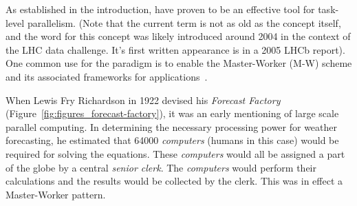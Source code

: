 \documentclass{sig-alternate}
\begin{document}

As established in the introduction, \pilotjobs have proven to be an
effective tool for task-level parallelism. (Note that the current term
\textit{\pilotjob} is not as old as the concept itself, and the word
\pilot for this concept was likely introduced around 2004 in the context
of the LHC data challenge. It's first written appearance is in a 2005
LHCb report\cite{lhcb2005}). 
One common use for the \pilotjob paradigm is to enable the Master-Worker
(M-W) scheme and its associated frameworks for
applications~\cite{Shao:2000:masterslave}.


When Lewis Fry Richardson in 1922 devised his \textit{Forecast Factory}
(Figure~\ref{fig:figures_forecast-factory}), it was an early mentioning
of large scale parallel computing. In determining the necessary
processing power for weather forecasting, he estimated that 64000
\textit{computers} (humans in this case) would be required for solving
the equations. These \textit{computers} would all be assigned a part of
the globe by a central \textit{senior clerk}. The \textit{computers}
would perform their calculations and the results would be collected by
the clerk. This was in effect a Master-Worker pattern.
\end{document}
